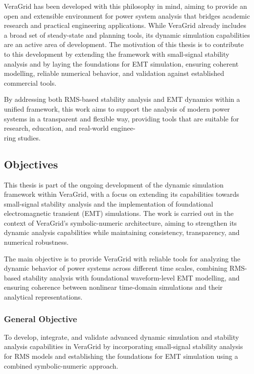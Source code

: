 VeraGrid has been developed with this philosophy in mind, aiming to provide an open and
extensible environment for power system analysis that bridges academic research and practical
engineering applications. While VeraGrid already includes a broad set of steady-state and
planning tools, its dynamic simulation capabilities are an active area of development. The
motivation of this thesis is to contribute to this development by extending the framework with
small-signal stability analysis and by laying the foundations for EMT simulation, ensuring
coherent modelling, reliable numerical behavior, and validation against established
commercial tools.

By addressing both RMS-based stability analysis and EMT dynamics within a unified framework,
this work aims to support the analysis of modern power systems in a transparent and flexible
way, providing tools that are suitable for research, education, and real-world enginee-\\ring
studies.


\subsection{Objectives}

This thesis is part of the ongoing development of the dynamic simulation framework within
VeraGrid, with a focus on extending its capabilities towards small-signal stability analysis
and the implementation of foundational electromagnetic transient (EMT) simulations.
The work is carried out in the context of VeraGrid's symbolic-numeric architecture, aiming
to strengthen its dynamic analysis capabilities while maintaining consistency, transparency,
and numerical robustness.

The main objective is to provide VeraGrid with reliable tools for analyzing the dynamic
behavior of power systems across different time scales, combining RMS-based stability
analysis with foundational waveform-level EMT modelling, and ensuring coherence between nonlinear
time-domain simulations and their analytical representations.

\subsubsection*{General Objective}

To develop, integrate, and validate advanced dynamic simulation and stability analysis
capabilities in VeraGrid by incorporating small-signal stability analysis for RMS models
and establishing the foundations for EMT simulation using a combined symbolic-numeric approach.

